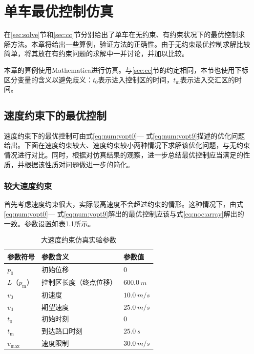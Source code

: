 \chapter{单车最优控制仿真}
\label{cha:exp}
在\ref{sec:solve}节和\ref{sec:cc}节分别给出了单车在无约束、有约束状况下的最优控制求解方法。本章将给出一些算例，验证方法的正确性。由于无约束最优控制求解比较简单，将其放在有约束问题的求解中一并讨论，并加以比较。

本章的算例使用{\ttfamily Mathematica}进行仿真。与\ref{sec:cc}节的约定相同，本节也使用下标区分变量的含义以避免歧义：$t_0$表示进入控制区的时间，$t_\mathrm{m}$表示进入交汇区的时间。

\section{速度约束下的最优控制}
速度约束下的最优控制可由式\eqref{eq:num:vopt0}--- 式\eqref{eq:num:vopt9}描述的优化问题给出。下面在速度约束较大、速度约束较小两种情况下求解该优化问题，与无约束情况进行对比。同时，根据对仿真结果的观察，进一步总结最优控制应当满足的性质，并根据该性质对问题做进一步的简化。

\subsection{较大速度约束}
首先考虑速度约束很大，实际最高速度不会超过约束的情形。这种情况下，由式\eqref{eq:num:vopt0}--- 式\eqref{eq:num:vopt9}解出的最优控制应该与式\eqref{eq:noc:array}解出的一致。参数设置如表\ref{tab:vbig:param}所示。
\begin{table}[htbp]
\centering
\caption{大速度约束仿真实验参数}
\label{tab:vbig:param}
\begin{tabular}{lll}
\toprule[1.5pt]
参数符号 & 参数含义 & 参数值 \\
\midrule[1pt]
$p_0$ & 初始位移 & $0$ \\
$L$（$p_\mathrm{m}$） & 控制区长度（终点位移） & $\SI{600.0}{m}$ \\
$v_0$ & 初速度 & $\SI{10.0}{m\per s}$ \\
$v_\mathrm{d}$ & 期望速度 & $\SI{25.0}{m\per s}$ \\
$t_0$ & 初始时刻 & $0$ \\
$t_\mathrm{m}$ & 到达路口时刻 & $\SI{25.0}{s}$ \\
$v_{\max}$ & 速度限制 & $\SI{30.0}{m\per s}$ \\
\bottomrule[1.5pt]
\end{tabular}
\end{table}

